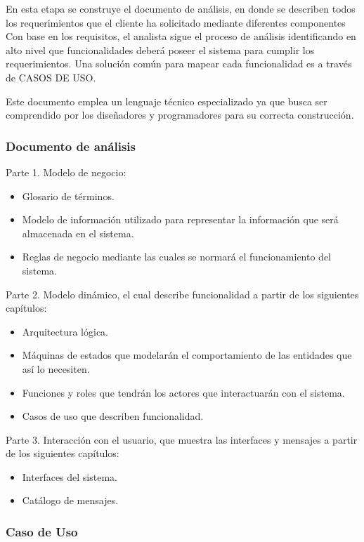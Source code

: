 \bigskip

En esta etapa se construye el documento de análisis, en donde se describen todos los requerimientos que el cliente ha solicitado mediante diferentes componentes
Con base en los requisitos, el analista sigue el proceso de análisis identificando en alto nivel que funcionalidades deberá poseer el sistema para cumplir los requerimientos. Una solución común para mapear cada funcionalidad es a través de CASOS DE USO.

Este documento emplea un lenguaje técnico especializado ya que busca ser comprendido por los diseñadores y programadores para su correcta construcción.

\subsubsection{Documento de análisis}

Parte 1. Modelo de negocio:
\begin{itemize}
	\item Glosario de términos.
	\item Modelo de información utilizado para representar la información que será almacenada en el sistema.
	\item Reglas de negocio mediante las cuales se normará el funcionamiento del sistema.
\end{itemize}

Parte 2. Modelo dinámico, el cual describe funcionalidad a partir de los siguientes capítulos:
\begin{itemize}
	\item Arquitectura lógica.
	\item Máquinas de estados que modelarán el comportamiento de las entidades que así lo necesiten.
	\item Funciones y roles que tendrán los actores que interactuarán con el sistema.
	\item Casos de uso que describen funcionalidad.
\end{itemize}

Parte 3. Interacción con el usuario, que muestra las interfaces y mensajes a partir de los siguientes capítulos:
\begin{itemize}
	\item Interfaces del sistema.
	\item Catálogo de mensajes.
\end{itemize}



\subsubsection{Caso de Uso}

